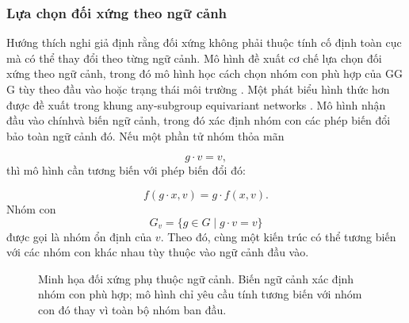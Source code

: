 \subsubsection{Lựa chọn đối xứng theo ngữ cảnh}
Hướng thích nghi giả định rằng đối xứng không phải thuộc tính cố định toàn cục mà có thể thay đổi theo từng ngữ cảnh. Mô hình đề xuất cơ chế lựa chọn đối xứng theo ngữ cảnh, trong đó mô hình học cách chọn nhóm con phù hợp của GG
G tùy theo đầu vào hoặc trạng thái môi trường \cite{gupta2024contextual}.
Một phát biểu hình thức hơn được đề xuất trong khung any-subgroup equivariant networks \cite{goel2025anysubgroup}. Mô hình nhận đầu vào chínhvà biến ngữ cảnh, trong đó
xác định nhóm con các phép biến đổi bảo toàn ngữ cảnh đó. Nếu một phần tử nhóm thỏa mãn

\begin{equation}
    g \cdot v = v,
    \label{eq:context-stabilizer}
\end{equation}
thì mô hình cần tương biến với phép biến đổi đó:

\begin{equation}
    f(g \cdot x, v)
    =
    g \cdot f(x, v).
    \label{eq:any-subgroup-equivariance}
\end{equation}
Nhóm con
\begin{equation}
    G_v
    =
    \{g \in G \mid g \cdot v = v\}
    \label{eq:context-dependent-subgroup}
\end{equation}
được gọi là nhóm ổn định của $v$. Theo đó, cùng một kiến trúc có thể tương biến với các nhóm con khác nhau tùy thuộc vào ngữ cảnh đầu vào.

\begin{figure}[H]
    \centering
    \caption{Minh họa đối xứng phụ thuộc ngữ cảnh. Biến ngữ cảnh xác định nhóm con phù hợp; mô hình chỉ yêu cầu tính tương biến với nhóm con đó thay vì toàn bộ nhóm ban đầu.}
    \label{fig:context-dependent-symmetry}
\end{figure}
